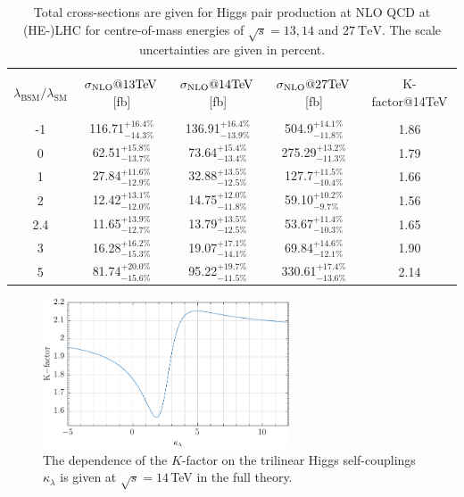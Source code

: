 \documentclass[a4paper]{jpconf}
\newcommand{\TeV}{\ensuremath{\mathrm{\:TeV}}}
\newcommand{\chhh}{\ensuremath{\kappa_{\lambda}}}
\begin{document}
\begin{table}[htb!]
\begin{center}
\begin{tabular}{| c | c | c |c|c|}
\hline
&&&&\\
$\lambda_{\mathrm{BSM}}/\lambda_{\mathrm{SM}}$ & $\sigma_{\rm{NLO}}@13 \mathrm{TeV}$\,[fb]& $\sigma_{\rm{NLO}}@14 \mathrm{TeV}$\,[fb] & $\sigma_{\rm{NLO}}@27 \mathrm{TeV}$\,[fb] &K-factor@14TeV\\
&&&&\\
\hline
-1& 116.71$^{+16.4\%}_{-14.3\%}$  & 136.91$^{+16.4\%}_{-13.9\%}$& 504.9$^{+14.1\%}_{-11.8\%}$ & 1.86 \\
\hline
0& 62.51$^{+15.8\%}_{-13.7\%}$ & 73.64$^{+15.4\%}_{-13.4\%}$& 275.29$^{+13.2\%}_{-11.3\%}$& 1.79  \\
\hline 
1& 27.84$^{+11.6\%}_{-12.9\%}$ & 32.88$^{+13.5\%}_{-12.5\%}$&127.7$^{+11.5\%}_{-10.4\%}$ &1.66\\
\hline
2 & 12.42$^{+13.1\%}_{-12.0\%}$ & 14.75$^{+12.0\%}_{-11.8\%}$ &  59.10$^{+10.2\%}_{-9.7\%}$ & 1.56 \\
\hline
2.4& 11.65$^{+13.9\%}_{-12.7\%}$ & 13.79$^{+13.5\%}_{-12.5\%}$& 53.67$^{+11.4\%}_{-10.3\%}$ & 1.65 \\
\hline
3& 16.28$^{+16.2\%}_{-15.3\%}$ & 19.07$^{+17.1\%}_{-14.1\%}$ & 69.84$^{+14.6\%}_{-12.1\%}$ & 1.90 \\
\hline 
5& 81.74$^{+20.0\%}_{-15.6\%}$  & 95.22$^{+19.7\%}_{-11.5\%}$& 330.61$^{+17.4\%}_{-13.6\%}$ & 2.14 \\
\hline 
\end{tabular}
\end{center}
\caption{Total cross-sections are given for Higgs pair production at NLO QCD at (HE-)LHC for centre-of-mass energies of $\sqrt{s}=13,14$ and $27 \TeV$. The scale uncertainties are given in percent.
\label{tab:sigmatot}}
\end{table}

\begin{figure}[htb!]
  \centering
    \includegraphics[width=0.65\textwidth]{plots/Kfactor.pdf}
\caption{The dependence of the $K$-factor on the trilinear Higgs self-couplings $\chhh$ is given at $\sqrt{s}=14$\,TeV in the full theory.}
\label{fig:Kfacvariation}
\end{figure}
\end{document}
